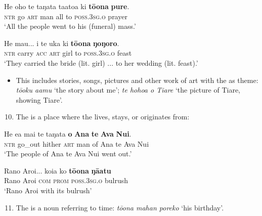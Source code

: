\ea\label{ex:6.92}
\gll He oho te taŋata ta{\ꞌ}ato{\ꞌ}a ki \textbf{tō{\ꞌ}ona} \textbf{pure}. \\
\textsc{ntr} go \textsc{art} man all to \textsc{poss.3sg.o} prayer \\

\glt 
‘All the people went to his (funeral) mass.’ \textstyleExampleref{[R309.141]} 
\z

\ea\label{ex:6.93}
\gll He ma{\ꞌ}u... i te uka ki \textbf{tō{\ꞌ}ona} \textbf{ŋoŋoro}. \\
\textsc{ntr} carry \textsc{acc} \textsc{art} girl to \textsc{poss.3sg.o} feast \\

\glt
‘They carried the bride (lit. girl) ... to her wedding (lit. feast).’ \textstyleExampleref{[R539-3.033]}
\z
\begin{itemize}
\item[]
This includes stories, songs, pictures and other work of art with the  as theme: \textit{tō{\ꞌ}oku {\ꞌ}a{\ꞌ}amu} ‘the story about me’; \textit{te hoho{\ꞌ}a o Tiare} ‘the picture of Tiare, showing Tiare’.
\end{itemize}

\begin{enumerate}
\setcounter{enumi}{9}
\item 
The  is a place where the  lives, stays, or originates from:

\end{enumerate}

\ea\label{ex:6.94}
\gll He e{\ꞌ}a mai te taŋata \textbf{o} \textbf{{\ꞌ}Ana} \textbf{te} \textbf{Ava} \textbf{Nui}. \\
\textsc{ntr} go\_out hither \textsc{art} man of Ana te Ava Nui \\

\glt 
‘The people of Ana te Ava Nui went out.’ \textstyleExampleref{[Mtx-3-01.283]}
\z

\ea\label{ex:6.95}
\gll Rano Aroi... koia ko \textbf{tō{\ꞌ}ona} \textbf{ŋā{\ꞌ}atu} \\
Rano Aroi \textsc{com} \textsc{prom} \textsc{poss.3sg.o} bulrush \\

\glt
‘Rano Aroi with its bulrush’ \textstyleExampleref{[R112.051]} 
\z

\begin{enumerate}
\setcounter{enumi}{10}
\item 
The  is a noun referring to time: \textit{t}\textit{ō{\ꞌ}ona mahan poreko} ‘his birthday’.

\end{enumerate}

